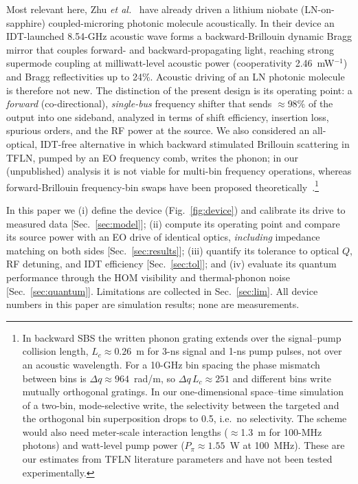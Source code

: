 \documentclass[aps,prapplied,reprint,superscriptaddress,amsmath,amssymb,floatfix]{revtex4-2}
\begin{document}
Most relevant here, Zhu \emph{et al.}~\cite{Zhu2025ao} have already driven a lithium niobate (LN-on-sapphire) coupled-microring photonic molecule acoustically. In their device an IDT-launched 8.54-GHz acoustic wave forms a backward-Brillouin dynamic Bragg mirror that couples forward- and backward-propagating light, reaching strong supermode coupling at milliwatt-level acoustic power (cooperativity 2.46~mW$^{-1}$) and Bragg reflectivities up to 24\%. Acoustic driving of an LN photonic molecule is therefore not new. The distinction of the present design is its operating point: a \emph{forward} (co-directional), \emph{single-bus} frequency shifter that sends $\approx$98\% of the output into one sideband, analyzed in terms of shift efficiency, insertion loss, spurious orders, and the RF power at the source. We also considered an all-optical, IDT-free alternative in which backward stimulated Brillouin scattering in TFLN, pumped by an EO frequency comb, writes the phonon; in our (unpublished) analysis it is not viable for multi-bin frequency operations, whereas forward-Brillouin frequency-bin swaps have been proposed theoretically~\cite{ShepherdBehunin2025}.\footnote{In backward SBS the written phonon grating extends over the signal--pump collision length, $L_c\approx0.26$~m for 3-ns signal and 1-ns pump pulses, not over an acoustic wavelength. For a 10-GHz bin spacing the phase mismatch between bins is $\Delta q\approx964$~rad/m, so $\Delta q\,L_c\approx251$ and different bins write mutually orthogonal gratings. In our one-dimensional space--time simulation of a two-bin, mode-selective write, the selectivity between the targeted and the orthogonal bin superposition drops to 0.5, i.e.\ no selectivity. The scheme would also need meter-scale interaction lengths ($\approx$1.3~m for 100-MHz photons) and watt-level pump power ($P_\pi\approx1.55$~W at 100~MHz). These are our estimates from TFLN literature parameters and have not been tested experimentally.}

In this paper we (i) define the device (Fig.~\ref{fig:device}) and calibrate its drive to measured data [Sec.~\ref{sec:model}]; (ii) compute its operating point and compare its source power with an EO drive of identical optics, \emph{including} impedance matching on both sides [Sec.~\ref{sec:results}]; (iii) quantify its tolerance to optical $Q$, RF detuning, and IDT efficiency [Sec.~\ref{sec:tol}]; and (iv) evaluate its quantum performance through the HOM visibility and thermal-phonon noise [Sec.~\ref{sec:quantum}]. Limitations are collected in Sec.~\ref{sec:lim}. All device numbers in this paper are simulation results; none are measurements.
\end{document}
